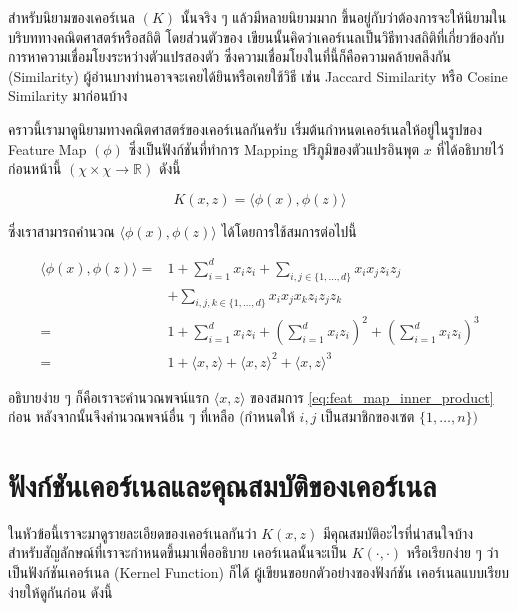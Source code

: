 สำหรับนิยามของเคอร์เนล $(K)$ นั้นจริง ๆ แล้วมีหลายนิยามมาก ขึ้นอยู่กับว่าต้องการจะให้นิยามในบริบททางคณิตศาสตร์หรือสถิติ โดยส่วนตัวของ%
เขียนนั้นคิดว่าเคอร์เนลเป็นวิธีทางสถิติที่เกี่ยวข้องกับการหาความเชื่อมโยงระหว่างตัวแปรสองตัว ซึ่งความเชื่อมโยงในที่นี้ก็คือความคล้ายคลึงกัน 
(Similarity) ผู้อ่านบางท่านอาจจะเคยได้ยินหรือเคยใช้วิธี เช่น Jaccard Similarity หรือ Cosine Similarity มาก่อนบ้าง 

คราวนี้เรามาดูนิยามทางคณิตศาสตร์ของเคอร์เนลกันครับ เริ่มต้นกำหนดเคอร์เนลให้อยู่ในรูปของ Feature Map $(\phi)$ ซึ่งเป็นฟังก์ชันที่ทำการ 
Mapping ปริภูมิของตัวแปรอินพุต $x$ ที่ได้อธิบายไว้ก่อนหน้านี้ $(\chi \times \chi \rightarrow \mathbb{R})$ ดังนี้

\begin{equation}\label{eq:kernel}
    K(x,z) = \langle\phi(x),\phi(z)\rangle
\end{equation}

\noindent ซึ่งเราสามารถคำนวณ $\langle\phi(x),\phi(z)\rangle$ ได้โดยการใช้สมการต่อไปนี้

\begin{align}
    \langle\phi(x),\phi(z)\rangle =& 1 + \sum_{i=1}^d x_i z_i + 
    \sum_{i,j\in\{1,\ldots,d\}} x_i x_j z_i z_j \nonumber \\
    &+ \sum_{i,j,k \in \{1,\ldots,d\}} x_i x_j x_k z_i z_j z_k \\
    =& 1 + \sum_{i=1}^d x_i z_i + \left(\sum_{i=1}^d x_i z_i \right)^2 + \left( \sum_{i=1}^d x_i z_i \right)^3 \\
    =& 1 + \langle x,z \rangle + \langle x,z \rangle^2 + \langle x,z \rangle^3\label{eq:feat_map_inner_product}
\end{align}

\noindent อธิบายง่าย ๆ ก็คือเราจะคำนวณพจน์แรก $\langle x,z \rangle$ ของสมการ \ref{eq:feat_map_inner_product} ก่อน 
หลังจากนั้นจึงคำนวณพจน์อื่น ๆ ที่เหลือ (กำหนดให้ $i,j$ เป็นสมาชิกของเซต $\{1, \dots, n\})$

\section{ฟังก์ชันเคอร์เนลและคุณสมบัติของเคอร์เนล}
\label{sec:func_kernel}

ในหัวข้อนี้เราจะมาดูรายละเอียดของเคอร์เนลกันว่า $K(x,z)$ มีคุณสมบัติอะไรที่น่าสนใจบ้าง สำหรับสัญลักษณ์ที่เราจะกำหนดขึ้นมาเพื่ออธิบาย%
เคอร์เนลนั้นจะเป็น $K(\cdot,\cdot)$ หรือเรียกง่าย ๆ ว่าเป็นฟังก์ชันเคอร์เนล (Kernel Function) ก็ได้ ผู้เขียนขอยกตัวอย่างของฟังก์ชัน%
เคอร์เนลแบบเรียบง่ายให้ดูกันก่อน ดังนี้

